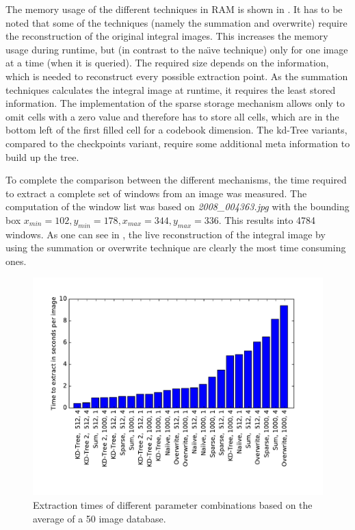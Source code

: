 The memory usage of the different techniques in \ac{RAM} is shown in . It has to be noted that some of the techniques (namely the summation and overwrite) require the reconstruction of the original integral images. This increases the memory usage during runtime, but (in contrast to the na\"{\i}ve technique) only for one image at a time (when it is queried). The required size depends on the information, which is needed to reconstruct every possible extraction point. As the summation techniques calculates the integral image at runtime, it requires the least stored information. The implementation of the sparse storage mechanism allows only to omit cells with a zero value and therefore has to store all cells, which are in the bottom left of the first filled cell for a codebook dimension. The kd-Tree variants, compared to the checkpoints variant, require some additional meta information to build up the tree.

To complete the comparison between the different mechanisms, the time required to extract a complete set of windows from an image was measured. The computation of the window list was based on \textit{2008\_004363.jpg} with the bounding box $x_{min} = 102, y_{min} = 178, x_{max} = 344, y_{max} = 336$. This results into 4784 windows. As one can see in , the live reconstruction of the integral image by using the summation or overwrite technique are clearly the most time consuming ones.


\begin{figure}
\centering
\includegraphics[width=\linewidth]{images/extract_times}
\caption[Extraction times of different parameter combinations.]{Extraction times of different parameter combinations based on the average of a 50 image database.}
\label{fig:extract_time}
\end{figure}

